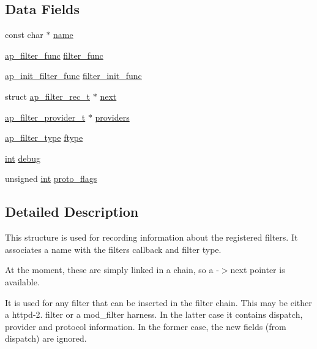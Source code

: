 \subsection*{Data Fields}
\begin{DoxyCompactItemize}
\item 
const char $\ast$ \hyperlink{structap__filter__rec__t_a85fe13ba0e1802986e19a56858d3198e}{name}
\item 
\hyperlink{unionap__filter__func}{ap\+\_\+filter\+\_\+func} \hyperlink{structap__filter__rec__t_a53fedc6d31f863c98fbe19fa5ae32bb0}{filter\+\_\+func}
\item 
\hyperlink{group__APACHE__CORE__FILTER_ga7ecd47b41aacab276198f6d1fc05a56c}{ap\+\_\+init\+\_\+filter\+\_\+func} \hyperlink{structap__filter__rec__t_a3bcc0263a11aa25b6050df5c62bfd2e0}{filter\+\_\+init\+\_\+func}
\item 
struct \hyperlink{structap__filter__rec__t}{ap\+\_\+filter\+\_\+rec\+\_\+t} $\ast$ \hyperlink{structap__filter__rec__t_a66a9bbdf6696798b2749bd98eb34badf}{next}
\item 
\hyperlink{structap__filter__provider__t}{ap\+\_\+filter\+\_\+provider\+\_\+t} $\ast$ \hyperlink{structap__filter__rec__t_a20f4b587f03697e977ff8df2247a463b}{providers}
\item 
\hyperlink{group__APACHE__CORE__FILTER_ga6dc4721ae075c103a3f3a93775d139fa}{ap\+\_\+filter\+\_\+type} \hyperlink{structap__filter__rec__t_a11dd49760277c33affdb52e9d6f099da}{ftype}
\item 
\hyperlink{pcre_8txt_a42dfa4ff673c82d8efe7144098fbc198}{int} \hyperlink{structap__filter__rec__t_a882b8c4c8f304e9e948baad79f46afa4}{debug}
\item 
unsigned \hyperlink{pcre_8txt_a42dfa4ff673c82d8efe7144098fbc198}{int} \hyperlink{structap__filter__rec__t_a5fbc2be1250c3f6084b358fdf59fa4ef}{proto\+\_\+flags}
\end{DoxyCompactItemize}


\subsection{Detailed Description}
This structure is used for recording information about the registered filters. It associates a name with the filter\textquotesingle{}s callback and filter type. 

At the moment, these are simply linked in a chain, so a -\/$>$next pointer is available.

It is used for any filter that can be inserted in the filter chain. This may be either a httpd-\/2. filter or a mod\+\_\+filter harness. In the latter case it contains dispatch, provider and protocol information. In the former case, the new fields (from dispatch) are ignored. 

